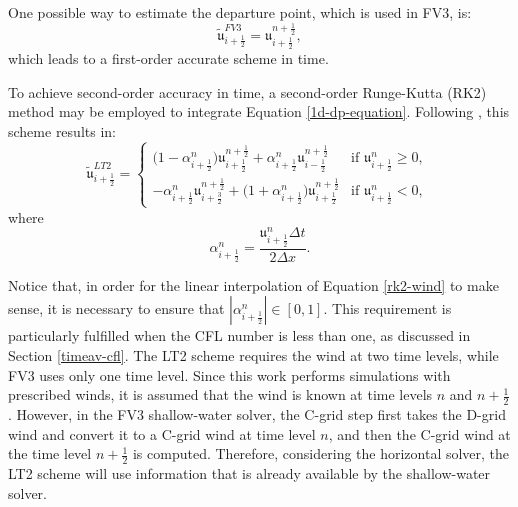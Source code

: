 \documentclass[preprint,12pt]{elsarticle}
\begin{document}
\begin{linenumbers}
One possible way to estimate the departure point, which is used in FV3, is:
\begin{equation}
	\label{dp-fv3}
	\tilde{\mathfrak{u}}^{FV3}_{i+\frac{1}{2}} = \mathfrak{u}^{n+\frac{1}{2}}_{i+\frac{1}{2}},
\end{equation}
which leads to a first-order accurate scheme in time.

To achieve second-order accuracy in time, a second-order Runge-Kutta (RK2) method may be employed to integrate Equation \eqref{1d-dp-equation}. Following \cite{durran:2010}, this scheme results in:
\begin{equation}
	\label{rk2-wind}
	\tilde{\mathfrak{u}}^{LT2}_{i+\frac{1}{2}} =
	\begin{cases}
		\big(1-\alpha_{i+\frac{1}{2}}^n \big)\mathfrak{\mathfrak{u}}^{n+\frac{1}{2}}_{i+\frac{1}{2}} +
		\alpha_{i+\frac{1}{2}}^n \mathfrak{u}^{n+\frac{1}{2}}_{i-\frac{1}{2}} & \text{if } {\mathfrak{u}}^n_{i+\frac{1}{2}}\geq 0,\\
		-\alpha_{i+\frac{1}{2}}^n \mathfrak{u}^{n+\frac{1}{2}}_{i+\frac{3}{2}} + \big(1+\alpha_{i+\frac{1}{2}}^n\big)
		\mathfrak{u}^{n+\frac{1}{2}}_{i+\frac{1}{2}} & \text{if } {\mathfrak{u}}^n_{i+\frac{1}{2}} < 0,\
	\end{cases}
\end{equation}
where $$\alpha_{i+\frac{1}{2}}^n =  \frac{\mathfrak{u}_{i+\frac{1}{2}}^n\Delta t}{2\Delta x}.$$

Notice that, in order for the linear interpolation of Equation \eqref{rk2-wind} to make sense, it is necessary to ensure that $|\alpha_{i+\frac{1}{2}}^n| \in [0,1]$. 
This requirement is particularly fulfilled when the CFL number is less than one, as discussed in Section \ref{timeav-cfl}.
The LT2 scheme requires the wind at two time levels, while FV3 uses only one time level. 
Since this work performs simulations with prescribed winds, it is  assumed that the wind is known at time levels $n$ and $n+\frac{1}{2}$.
However, in the FV3 shallow-water solver, the C-grid step first takes the D-grid wind and convert it to a C-grid wind at time level $n$, and then the  C-grid wind at the time level $n+\frac{1}{2}$ is computed.
Therefore, considering the horizontal solver, the LT2 scheme will use information that is already available by the shallow-water solver.


\end{linenumbers}
\end{document}
